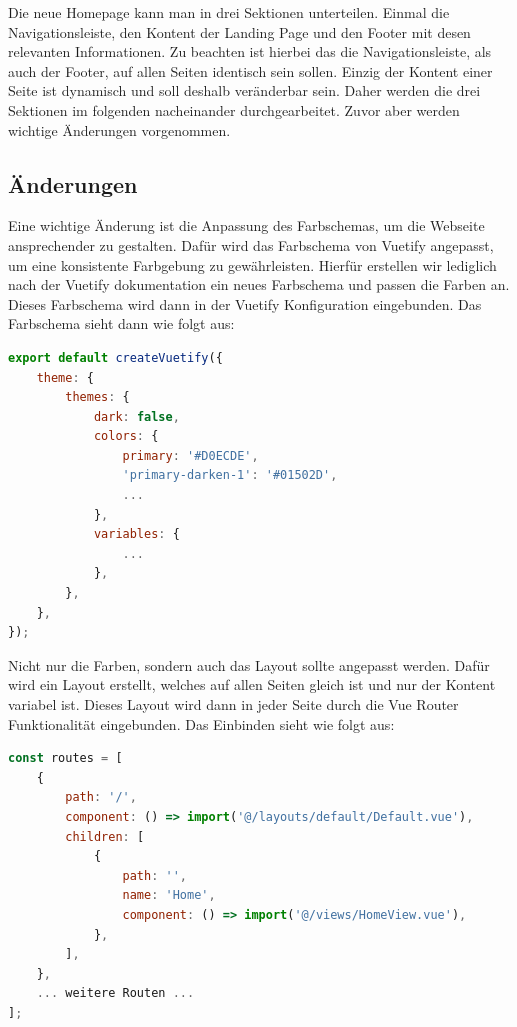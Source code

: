 Die neue Homepage kann man in drei Sektionen unterteilen.
Einmal die Navigationsleiste, den Kontent der Landing Page und den Footer mit desen relevanten Informationen.
Zu beachten ist hierbei das die Navigationsleiste, als auch der Footer, auf allen Seiten identisch sein sollen.
Einzig der Kontent einer Seite ist dynamisch und soll deshalb veränderbar sein.
Daher werden die drei Sektionen im folgenden nacheinander durchgearbeitet.
Zuvor aber werden wichtige Änderungen vorgenommen.

\subsection{Änderungen}

Eine wichtige Änderung ist die Anpassung des Farbschemas, um die Webseite ansprechender zu gestalten. Dafür wird das Farbschema von Vuetify angepasst, um eine konsistente Farbgebung zu gewährleisten. Hierfür erstellen wir lediglich nach der Vuetify dokumentation ein neues Farbschema und passen die Farben an. Dieses Farbschema wird dann in der Vuetify Konfiguration eingebunden. Das Farbschema sieht dann wie folgt aus: \cite{vuetiy-custom-color-theme}

\begin{lstlisting}[language={JavaScript}, caption={Vuetify Farbschema anpassung}]
export default createVuetify({
    theme: {
        themes: {
            dark: false,
            colors: {
                primary: '#D0ECDE',
                'primary-darken-1': '#01502D',
                ...
            },
            variables: {
                ...
            },
        },
    },
});
\end{lstlisting}

Nicht nur die Farben, sondern auch das Layout sollte angepasst werden.
Dafür wird ein Layout erstellt, welches auf allen Seiten gleich ist und nur der Kontent variabel ist.
Dieses Layout wird dann in jeder Seite durch die Vue Router Funktionalität eingebunden.
Das Einbinden sieht wie folgt aus:

\begin{lstlisting}[language={JavaScript}, caption={Einbindung des Layouts in der Vue Router Konfiguration}]
const routes = [
    {
        path: '/',
        component: () => import('@/layouts/default/Default.vue'),
        children: [
            {
                path: '',
                name: 'Home',
                component: () => import('@/views/HomeView.vue'),
            },
        ],
    },
    ... weitere Routen ...
];
\end{lstlisting}

